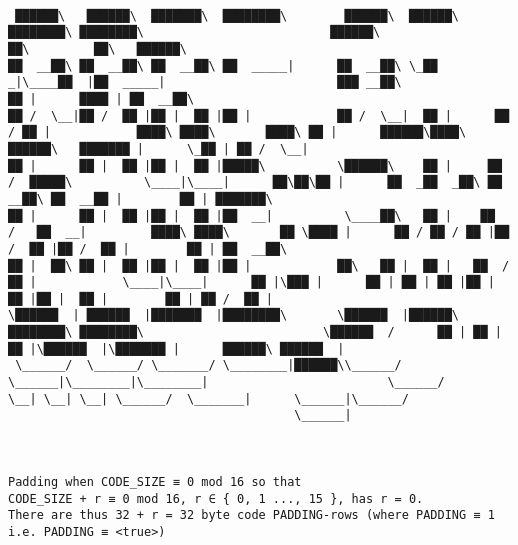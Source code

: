 \documentclass[varwidth=\maxdimen,margin=0.5cm,multi={verbatim}]{standalone}
\begin{document}
\begin{verbatim}

 ██████\   ██████\  ███████\  ████████\        ██████\  ██████\ ████████\ ████████\                          ██████\                                      ██\         ██\   ██████\
██  __██\ ██  __██\ ██  __██\ ██  _____|      ██  __██\ \_██  _|\____██  |██  _____|                        ███ __██\                                     ██ |      ████ | ██  __██\
██ /  \__|██ /  ██ |██ |  ██ |██ |            ██ /  \__|  ██ |      ██  / ██ |            ████\ ████\       ████\ ██ |      ██████\████\   ██████\   ███████ |      \_██ | ██ /  \__|
██ |      ██ |  ██ |██ |  ██ |█████\          \██████\    ██ |     ██  /  █████\          \____|\____|      ██\██\██ |      ██  _██  _██\ ██  __██\ ██  __██ |        ██ | ███████\
██ |      ██ |  ██ |██ |  ██ |██  __|          \____██\   ██ |    ██  /   ██  __|         ████\ ████\       ██ \████ |      ██ / ██ / ██ |██ /  ██ |██ /  ██ |        ██ | ██  __██\
██ |  ██\ ██ |  ██ |██ |  ██ |██ |            ██\   ██ |  ██ |   ██  /    ██ |            \____|\____|      ██ |\███ |      ██ | ██ | ██ |██ |  ██ |██ |  ██ |        ██ | ██ /  ██ |
\██████  | ██████  |███████  |████████\       \██████  |██████\ ████████\ ████████\                         \██████  /      ██ | ██ | ██ |\██████  |\███████ |      ██████\ ██████  |
 \______/  \______/ \_______/ \________|██████\\______/ \______|\________|\________|                         \______/       \__| \__| \__| \______/  \_______|      \______|\______/
                                        \______|



Padding when CODE_SIZE ≡ 0 mod 16 so that
CODE_SIZE + r ≡ 0 mod 16, r ∈ { 0, 1 ..., 15 }, has r = 0.
There are thus 32 + r = 32 byte code PADDING-rows (where PADDING ≡ 1 i.e. PADDING ≡ <true>)


\end{verbatim}
\end{document}
